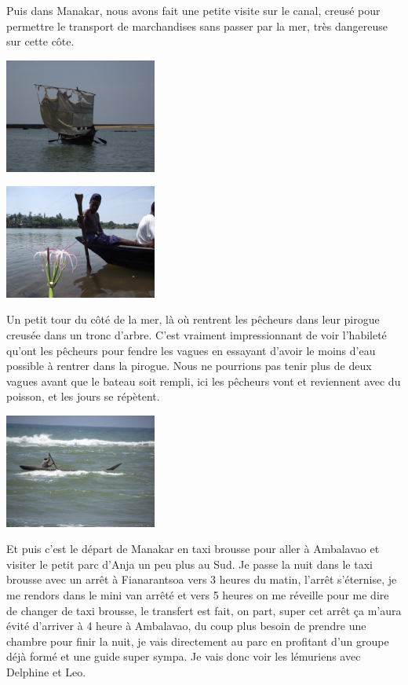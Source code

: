 \begin{multicols}{2}
Puis dans Manakar, nous avons fait une petite visite sur le canal, creusé pour permettre le transport de marchandises sans passer par la mer, très dangereuse sur cette côte.

\smallbreak
\hspace*{-0.65cm}
\includegraphics[width=5cm]{articles/Salut-vazaha/DSCF0211.JPG}
\smallbreak

\smallbreak
\hspace*{-0.65cm}
\includegraphics[width=5cm]{articles/Salut-vazaha/DSCF0225.JPG}
\smallbreak

Un petit tour du côté de la mer, là où rentrent les pêcheurs dans leur pirogue creusée dans un tronc d'arbre. C'est vraiment impressionnant de voir l'habileté qu'ont les pêcheurs pour fendre les vagues en essayant d'avoir le moins d'eau possible à rentrer dans la pirogue. Nous ne pourrions pas tenir plus de deux vagues avant que le bateau soit rempli, ici les pêcheurs vont et reviennent avec du poisson, et les jours se répètent.

\smallbreak
\hspace*{-0.65cm}
\includegraphics[width=5cm]{articles/Salut-vazaha/DSCF0241.JPG}
\smallbreak

Et puis c'est le départ de Manakar en taxi brousse pour aller à Ambalavao et visiter le petit parc d'Anja un peu plus au Sud. Je passe la nuit dans le taxi brousse avec un arrêt à Fianarantsoa vers 3 heures du matin, l'arrêt s'éternise, je me rendors dans le mini van arrêté et vers 5 heures on me réveille pour me dire de changer de taxi brousse, le transfert est fait, on part, super cet arrêt ça m'aura évité d'arriver à 4 heure à Ambalavao, du coup plus besoin de prendre une chambre pour finir la nuit, je vais directement au parc en profitant d'un groupe déjà formé et une guide super sympa. Je vais donc voir les lémuriens avec Delphine et Leo.


\end{multicols}
